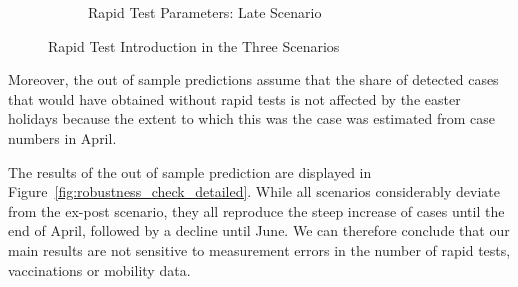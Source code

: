 \begin{figure}[ht]
\begin{subfigure}[b]{0.3\textwidth}
    \caption{Rapid Test Parameters: Late Scenario}
    \label{fig:robustness_late_params}
  \end{subfigure}

  \caption{Rapid Test Introduction in the Three Scenarios}
  \label{fig:robustness_check_rapid_test_params}

\end{figure}

Moreover, the out of sample predictions assume that the share of detected cases that
would have obtained without rapid tests is not affected by the easter holidays because
the extent to which this was the case was estimated from case numbers in April.

The results of the out of sample prediction are displayed in
Figure~\ref{fig:robustness_check_detailed}. While all scenarios considerably deviate from
the ex-post scenario, they all reproduce the steep increase of cases until the end
of April, followed by a decline until June. We can therefore conclude that our main
results are not sensitive to measurement errors in the number of rapid tests,
vaccinations or mobility data.


